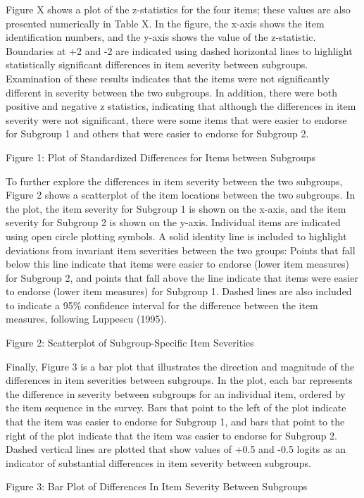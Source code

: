 \documentclass[
  letterpaper,
]{article}
\begin{document}
Figure X shows a plot of the z-statistics for the four items; these
values are also presented numerically in Table X. In the figure, the
x-axis shows the item identification numbers, and the y-axis shows the
value of the z-statistic. Boundaries at +2 and -2 are indicated using
dashed horizontal lines to highlight statistically significant
differences in item severity between subgroups. Examination of these
results indicates that the items were not significantly different in
severity between the two subgroups. In addition, there were both
positive and negative z statistics, indicating that although the
differences in item severity were not significant, there were some items
that were easier to endorse for Subgroup 1 and others that were easier
to endorse for Subgroup 2.

Figure 1: Plot of Standardized Differences for Items between Subgroups

To further explore the differences in item severity between the two
subgroups, Figure 2 shows a scatterplot of the item locations between
the two subgroups. In the plot, the item severity for Subgroup 1 is
shown on the x-axis, and the item severity for Subgroup 2 is shown on
the y-axis. Individual items are indicated using open circle plotting
symbols. A solid identity line is included to highlight deviations from
invariant item severities between the two groups: Points that fall below
this line indicate that items were easier to endorse (lower item
measures) for Subgroup 2, and points that fall above the line indicate
that items were easier to endorse (lower item measures) for Subgroup 1.
Dashed lines are also included to indicate a 95\% confidence interval
for the difference between the item measures, following Luppescu (1995).

Figure 2: Scatterplot of Subgroup-Specific Item Severities

Finally, Figure 3 is a bar plot that illustrates the direction and
magnitude of the differences in item severities between subgroups. In
the plot, each bar represents the difference in severity between
subgroups for an individual item, ordered by the item sequence in the
survey. Bars that point to the left of the plot indicate that the item
was easier to endorse for Subgroup 1, and bars that point to the right
of the plot indicate that the item was easier to endorse for Subgroup 2.
Dashed vertical lines are plotted that show values of +0.5 and -0.5
logits as an indicator of substantial differences in item severity
between subgroups.

Figure 3: Bar Plot of Differences In Item Severity Between Subgroups
\end{document}
